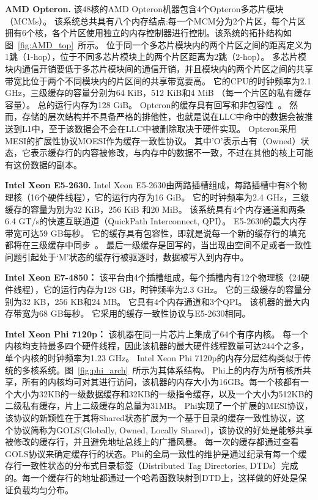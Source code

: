 \textbf{AMD Opteron.} 该48核的AMD Opteron机器包含4个Opteron多芯片模块（MCMs）。
该系统总共具有八个内存结点:每一个MCM分为2个片区，每个片区拥有6个核，各个片区使用独立的内存控制器进行控制。该系统的拓扑结构如图~\ref{fig:AMD_top}~所示。
位于同一个多芯片模块内的两个片区之间的距离定义为1跳（1-hop），位于不同多芯片模块上的两个片区距离为2跳（2-hop）。
多芯片模块内通信开销要低于多芯片模块间的通信开销，并且模块内的两个片区之间的共享带宽比位于两个不同模块内的片区间的共享带宽要高。
它的CPU的时钟频率为2.1 GHz，三级缓存的容量分别为64 KiB，512 KiB和4 MiB （每一个片区的私有缓存容量）。
总的运行内存为128 GiB。
Opteron的缓存具有回写和非包容性~\cite{Conway2010Cache}。
然而，存储的层次结构并不具备严格的排他性，也就是说在LLC中命中的数据会被推送到L1中，至于该数据会不会在LLC中被删除取决于硬件实现。 
Opteron采用MESI的扩展性协议MOESI作为缓存一致性协议。
其中’O’表示占有（Owned）状态，它表示缓存行的内容被修改，与内存中的数据不一致，不过在其他的核上可能有这份数据的副本。

\textbf{Intel Xeon E5-2630.} Intel Xeon E5-2630由两路插槽组成，每路插槽中有8个物理核（16个硬件线程），它的运行内存为16 GiB。
它的时钟频率为2.4 GHz，三级缓存的容量为别为32 KiB，256 KiB 和20 MiB。
该系统具有4个内存通道和两条6.4 GT/s的快速互联通道（QuickPath Interconnect, QPI）。
E5-2630的最大内存带宽可达59 GB每秒。
它的缓存具有包容性，即就是说每一个新的缓存行的填充都将在三级缓存中同步~\cite{intel2016}。
最后一级缓存是回写的，当出现由空间不足或者一致性问题引起处于‘M’状态的缓存行被驱逐时，数据被写入到内存中。

\textbf{Intel Xeon E7-4850：} 该平台由4个插槽组成，每个插槽内有12个物理核（24硬件线程），它的运行内存为128 GB，时钟频率为2.3 GHz。
它的三级缓存的容量分别为32 KB，256 KB和24 MB。
它具有4个内存通道和3个QPI。
该机器的最大内存带宽为68 GB每秒。
它采用的缓存一致性协议与E5-2630相同。

\textbf{Intel Xeon Phi 7120p：} 该机器在同一片芯片上集成了64个有序内核。
每一个内核均支持最多四个硬件线程，因此该机器的最大硬件线程数量可达244个之多，单个内核的时钟频率为1.23 GHz。
Intel Xeon Phi 7120p的内存分层结构类似于传统的多核系统。图~\ref{fig:phi_arch}~所示为其体系结构。
Phi上的内存为所有核所共享，所有的内核均可对其进行访问，该机器的内存大小为16GB。每一个核都有一个大小为32KB的一级数据缓存和32KB的一级指令缓存，以及一个大小为512KB的二级私有缓存，片上二级缓存的总量为31MB。
Phi实现了一个扩展的MESI协议，该协议的新颖性在于其将Shared状态扩展为一个基于目录的缓存一致性协议，这个协议简称为GOLS(Globally, Owned, Locally Shared)，该协议的好处是能够共享被修改的缓存行，并且避免地址总线上的广播风暴。
每一次的缓存都通过查看GOLS协议来确定缓存行的状态。Phi的全局一致性的维护是通过纪录有每一个缓存行一致性状态的分布式目录标签（Distributed Tag Directories, DTDs）完成的。每一个缓存行的地址都通过一个哈希函数映射到DTD上，这样做的好处是保证负载均匀分布。

